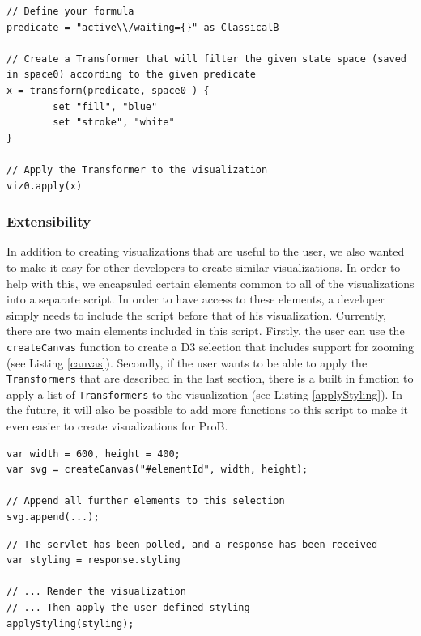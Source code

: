 \begin{lstlisting}[caption=Create a \texttt{Transformer} based on the states that match a given predicate,label=dynamicTransformer]
// Define your formula
predicate = "active\\/waiting={}" as ClassicalB

// Create a Transformer that will filter the given state space (saved in space0) according to the given predicate
x = transform(predicate, space0 ) {
		set "fill", "blue"
		set "stroke", "white"
}

// Apply the Transformer to the visualization
viz0.apply(x)
\end{lstlisting}

\subsubsection{Extensibility}

In addition to creating visualizations that are useful to the user, we also wanted to make it easy for other developers to create similar visualizations. In order to help with this, we encapsuled certain elements common to all of the visualizations into a separate script. In order to have access to these elements, a developer simply needs to include the script before that of his visualization. Currently, there are two main elements included in this script. Firstly, the user can use the \texttt{createCanvas} function to create a D3 selection that includes support for zooming (see Listing \ref{canvas}). Secondly, if the user wants to be able to apply the \texttt{Transformers} that are described in the last section, there is a built in function to apply a list of \texttt{Transformers} to the visualization (see Listing \ref{applyStyling}). In the future, it will also be possible to add more functions to this script to make it even easier to create visualizations for ProB.

\begin{lstlisting}[caption=Append a D3 selection to an element that includes support for zooming,label=canvas]
var width = 600, height = 400;
var svg = createCanvas("#elementId", width, height);

// Append all further elements to this selection
svg.append(...);
\end{lstlisting}

\begin{lstlisting}[caption=Apply list of \texttt{Transformers} received from servlet,label=applyStyling]
// The servlet has been polled, and a response has been received
var styling = response.styling

// ... Render the visualization
// ... Then apply the user defined styling
applyStyling(styling);
\end{lstlisting}


